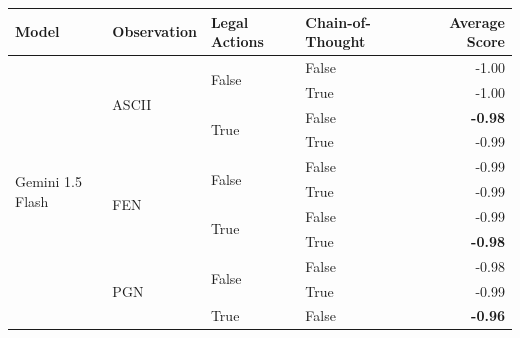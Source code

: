 \begin{tabular}{@{}llllr@{}}
    \toprule
    \textbf{Model}                              & \textbf{Observation}      & \textbf{Legal Actions}    & \textbf{Chain-of-Thought} & \textbf{Average Score} \\
    \midrule    
    \multirow[c]{17}{*}{Gemini 1.5 Flash}       & \multirow[c]{4}{*}{ASCII} & \multirow[c]{2}{*}{False} & False                     &  -1.00 \\
                                                &                           &                           & True                      &  -1.00 \\
                                                &                           & \multirow[c]{2}{*}{True}  & False                     &  \textbf{-0.98} \\
                                                &                           &                           & True                      &  -0.99 \\
    \cmidrule{2-5}                                                                                                                      
                                                & \multirow[c]{4}{*}{FEN}   & \multirow[c]{2}{*}{False} & False                     &  -0.99 \\
                                                &                           &                           & True                      &  -0.99 \\
                                                &                           & \multirow[c]{2}{*}{True}  & False                     &  -0.99 \\
                                                &                           &                           & True                      &  \textbf{-0.98} \\
    \cmidrule{2-5}                                                                                                                      
                                                & \multirow[c]{4}{*}{PGN}   & \multirow[c]{2}{*}{False} & False                     &  -0.98 \\
                                                &                           &                           & True                      &  -0.99 \\
                                                &                           & \multirow[c]{2}{*}{True}  & False                     &  \textbf{-0.96} \\

\end{tabular}
